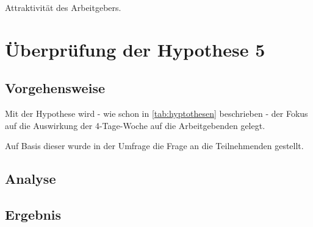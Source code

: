 Attraktivität des Arbeitgebers. 

\chapter{Überprüfung der Hypothese 5}
\label{chap:hypothese5}


\section{Vorgehensweise}
Mit der Hypothese  wird - wie schon in \ref{tab:hyptothesen} beschrieben - der Fokus auf die 
Auswirkung der 4-Tage-Woche auf die Arbeitgebenden gelegt. 

Auf Basis dieser wurde in der Umfrage die Frage  an die Teilnehmenden gestellt.

\section{Analyse}

\section{Ergebnis}